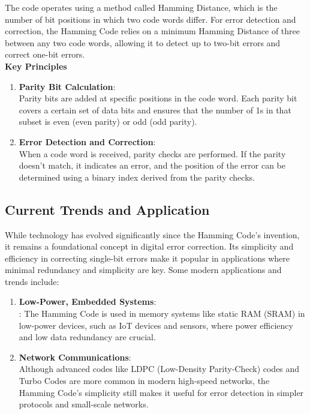 \documentclass{article}
\begin{document}
The code operates using a method called Hamming Distance, which is the number of bit positions in which two code words differ. For error detection and correction, the Hamming Code relies on a minimum Hamming Distance of three between any two code words, allowing it to detect up to two-bit errors and correct one-bit errors.\\
\textbf{Key Principles}
    \begin{enumerate}
        \item \textbf{Parity Bit Calculation}: \\ Parity bits are added at specific positions in the code word. Each parity bit covers a certain set of data bits and ensures that the number of 1s in that subset is even (even parity) or odd (odd parity).
        \item \textbf{Error Detection and Correction}: \\ When a code word is received, parity checks are performed. If the parity doesn’t match, it indicates an error, and the position of the error can be determined using a binary index derived from the parity checks.
    \end{enumerate}

\subsection{Current Trends and Application}
While technology has evolved significantly since the Hamming Code's invention, it remains a foundational concept in digital error correction. Its simplicity and efficiency in correcting single-bit errors make it popular in applications where minimal redundancy and simplicity are key. Some modern applications and trends include:
    \begin{enumerate}
        \item \textbf{Low-Power, Embedded Systems}: \\ : The Hamming Code is used in memory systems like static RAM (SRAM) in low-power devices, such as IoT devices and sensors, where power efficiency and low data redundancy are crucial.
        \item \textbf{Network Communications}: \\ Although advanced codes like LDPC (Low-Density Parity-Check) codes and Turbo Codes are more common in modern high-speed networks, the Hamming Code’s simplicity still makes it useful for error detection in simpler protocols and small-scale networks.
    \end{enumerate}
    
\end{document}
